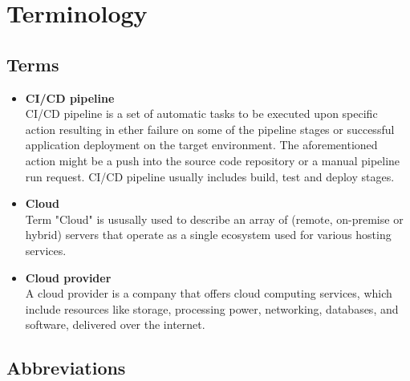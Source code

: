 \chapter*{Terminology}

\section*{Terms}

\begin{itemize}
    \setlength\itemsep{1px}
    \item \textbf{CI/CD pipeline} \\
    CI/CD pipeline is a set of automatic tasks to be executed upon specific action resulting in ether failure on some of the pipeline stages or successful application deployment on the target environment. The aforementioned action might be a push into the source code repository or a manual pipeline run request. CI/CD pipeline usually includes build, test and deploy stages.
    \setlength\itemsep{1px}
    \item \textbf{Cloud} \\
    Term "Cloud" is ususally used to describe an array of (remote, on-premise or hybrid) servers that operate as a single ecosystem used for various hosting services.
    \item \textbf{Cloud provider} \\
    A cloud provider is a company that offers cloud computing services, which include resources like storage, processing power, networking, databases, and software, delivered over the internet.
\end{itemize}

\section*{Abbreviations}

